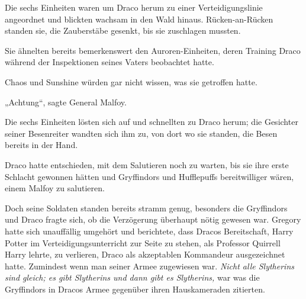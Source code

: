 Die sechs Einheiten waren um Draco herum zu einer Verteidigungslinie angeordnet und blickten wachsam in den Wald hinaus. Rücken-an-Rücken standen sie, die Zauberstäbe gesenkt, bis sie zuschlagen mussten.

Sie ähnelten bereits bemerkenswert den Auroren-Einheiten, deren Training Draco während der Inspektionen seines Vaters beobachtet hatte.

Chaos und Sunshine würden gar nicht wissen, was sie getroffen hatte.

„Achtung“, sagte General Malfoy.

Die sechs Einheiten lösten sich auf und schnellten zu Draco herum; die Gesichter seiner Besenreiter wandten sich ihm zu, von dort wo sie standen, die Besen bereits in der Hand.

Draco hatte entschieden, mit dem Salutieren noch zu warten, bis sie ihre erste Schlacht gewonnen hätten und Gryffindors und Hufflepuffs bereitwilliger wären, einem Malfoy zu salutieren.

Doch seine Soldaten standen bereits stramm genug, besonders die Gryffindors und Draco fragte sich, ob die Verzögerung überhaupt nötig gewesen war. Gregory hatte sich unauffällig umgehört und berichtete, dass Dracos Bereitschaft, Harry Potter im Verteidigungsunterricht zur Seite zu stehen, als Professor Quirrell Harry lehrte, zu verlieren, Draco als akzeptablen Kommandeur ausgezeichnet hatte. Zumindest wenn man seiner Armee zugewiesen war. \emph{Nicht alle Slytherins sind gleich; es gibt Slytherins und dann gibt es Slytherins,} war was die Gryffindors in Dracos Armee gegenüber ihren Hauskameraden zitierten.

